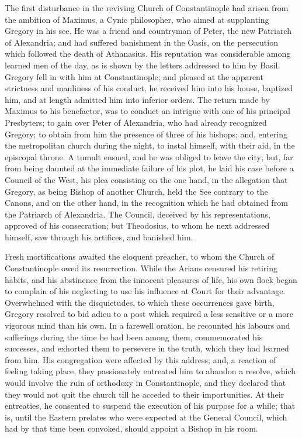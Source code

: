 The first disturbance in the reviving Church of Constantinople had
arisen from the ambition of Maximus, a Cynic philosopher, who aimed at
supplanting Gregory in his see. He was a friend and countryman of
Peter, the new Patriarch of Alexandria; and had suffered banishment in
the Oasis, on the persecution which followed the death of Athanasius.
His reputation was considerable among learned men of the day, as is
shown by the letters addressed to him by Basil. Gregory fell in with
him at Constantinople; and pleased at the apparent strictness and
manliness of his conduct, he received him into his house, baptized
him, and at length admitted him into inferior orders. The return made
by Maximus to his benefactor, was to conduct an intrigue with one of
his principal Presbyters; to gain over Peter of Alexandria, who had
already recognized Gregory; to obtain from him the presence of three
of his bishops; and, entering the metropolitan church during the
night, to instal himself, with their aid, in the episcopal throne. A
tumult ensued, and he was obliged to leave the city; but, far from
being daunted at the immediate failure of his plot, he laid his case
before a Council of the West, his plea consisting on the one
hand, in the allegation that Gregory, as being Bishop of another
Church, held the See contrary to the Canons, and on the other hand, in
the recognition which he had obtained from the Patriarch of
Alexandria. The Council, deceived by his representations, approved of
his consecration; but Theodosius, to whom he next addressed himself,
saw through his artifices, and banished him.

Fresh mortifications awaited the eloquent preacher, to whom the
Church of Constantinople owed its resurrection. While the Arians
censured his retiring habits, and his abstinence from the innocent
pleasures of life, his own flock began to complain of his neglecting
to use his influence at Court for their advantage. Overwhelmed with
the disquietudes, to which these occurrences gave birth, Gregory
resolved to bid adieu to a post which required a less sensitive or a
more vigorous mind than his own. In a farewell oration, he recounted
his labours and sufferings during the time he had been among them,
commemorated his successes, and exhorted them to persevere in the
truth, which they had learned from him. His congregation were affected
by this address; and, a reaction of feeling taking place, they
passionately entreated him to abandon a resolve, which would involve
the ruin of orthodoxy in Constantinople, and they declared that they
would not quit the church till he acceded to their importunities. At
their entreaties, he consented to suspend the execution of his purpose
for a while; that is, until the Eastern prelates who were expected at
the General Council, which had by that time been convoked, should
appoint a Bishop in his room.

